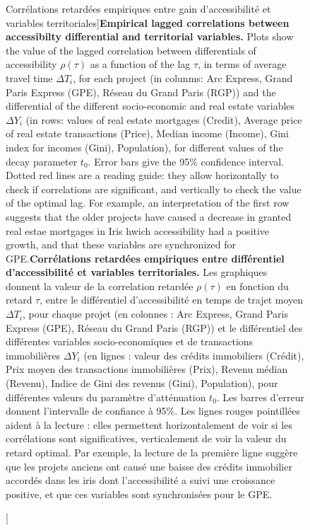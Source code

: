 \begin{figure}
\caption[Empirical lagged correlations between accessibilty gain and territorial variables][Corrélations retardées empiriques entre gain d'accessibilité et variables territoriales]{\textbf{Empirical lagged correlations between accessibilty differential and territorial variables.} Plots show the value of the lagged correlation between differentials of accessibility $\rho(\tau)$ as a function of the lag $\tau$, in terms of average travel time $\Delta T_i$, for each project (in colunms: Arc Express, Grand Paris Express (GPE), Réseau du Grand Paris (RGP)) and the differential of the different socio-economic and real estate variables $\Delta Y_i$ (in rows: values of real estate mortgages (Credit), Average price of real estate transactions (Price), Median income (Income), Gini index for incomes (Gini), Population), for different values of the decay parameter $t_0$. Error bars give the 95\% confidence interval. Dotted red lines are a reading guide: they allow horizontally to check if correlations are significant, and vertically to check the value of the optimal lag. For example, an interpretation of the first row suggests that the older projects have caused a decrease in granted real estae mortgages in Iris hwich accessibility had a positive growth, and that these variables are synchronized for GPE.\label{fig:empiricalres}}{\textbf{Corrélations retardées empiriques entre différentiel d'accessibilité et variables territoriales.} Les graphiques donnent la valeur de la correlation retardée $\rho(\tau)$ en fonction du retard $\tau$, entre le différentiel d'accessibilité en temps de trajet moyen $\Delta T_i$, pour chaque projet (en colonnes : Arc Express, Grand Paris Express (GPE), Réseau du Grand Paris (RGP)) et le différentiel des différentes variables socio-economiques et de transactions immobilières $\Delta Y_i$ (en lignes : valeur des crédits immobiliers (Crédit), Prix moyen des transactions immobilières (Prix), Revenu médian (Revenu), Indice de Gini des revenus (Gini), Population), pour différentes valeurs du paramètre d'atténuation $t_0$. Les barres d'erreur donnent l'intervalle de confiance à 95\%. Les lignes rouges pointillées aident à la lecture : elles permettent horizontalement de voir si les corrélations sont significatives, verticalement de voir la valeur du retard optimal. Par exemple, la lecture de la première ligne suggère que les projets anciens ont causé une baisse des crédits immobilier accordés dans les iris dont l'accessibilité a suivi une croissance positive, et que ces variables sont synchronisées pour le GPE.\label{fig:casestudies:empiricalres}}
\end{figure}

